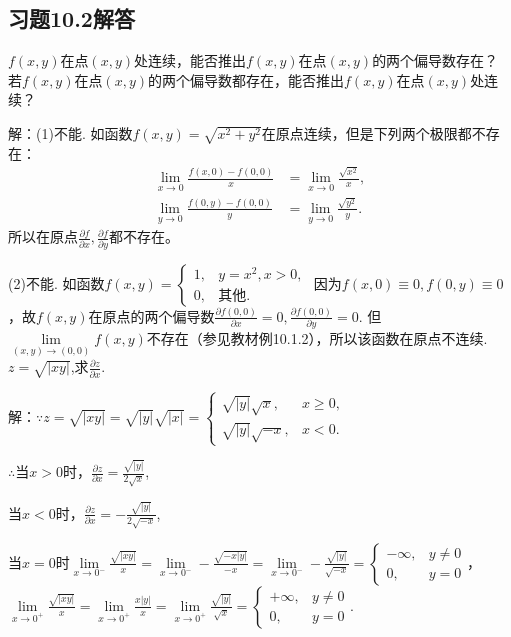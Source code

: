 \documentclass[12pt,UTF8]{ctexart}
\begin{document}
\subsection{习题10.2解答}
\begin{enumerate}
$f(x,y)$在点$(x,y)$处连续，能否推出$f(x,y)$在点$(x,y)$的两个偏导数存在？若$f(x,y)$在点$(x,y)$的两个偏导数都存在，能否推出$f(x,y)$在点$(x,y)$处连续？

解：(1)不能. 如函数$f(x,y)=\sqrt{x^2+y^2}$在原点连续，但是下列两个极限都不存在：
\[\begin{split}
\lim\limits_{x\rightarrow0}\frac{f(x,0)-f(0,0)}{x}&=\lim\limits_{x\rightarrow0}\frac{\sqrt{x^2}}{x},\\
\lim\limits_{y\rightarrow0}\frac{f(0,y)-f(0,0)}{y}&=\lim\limits_{y\rightarrow0}\frac{\sqrt{y^2}}{y}.
\end{split}\]
所以在原点$\frac{\partial f}{\partial x},\frac{\partial f}{\partial y}$都不存在。

(2)不能. 如函数$f(x,y)=\begin{cases}
1,&y=x^2,x>0,\\
0,&\text{其他}.
\end{cases}$ 因为$f(x,0)\equiv0,f(0,y)\equiv0$，故$f(x,y)$在原点的两个偏导数$\frac{\partial f(0,0)}{\partial x}=0,\frac{\partial f(0,0)}{\partial y}=0$. 但$\lim\limits_{(x,y)\rightarrow(0,0)}f(x,y)$不存在（参见教材例10.1.2），所以该函数在原点不连续.
$z=\sqrt{|xy|}$,求$\frac{\partial z}{\partial x}$.

解：$\because z=\sqrt{|xy|}=\sqrt{|y|}\sqrt{|x|}=\begin{cases}
\sqrt{|y|}\sqrt{x},&x\geq0,\\
\sqrt{|y|}\sqrt{-x},&x<0.
\end{cases}$

$\therefore$当$x>0$时，$\frac{\partial z}{\partial x}=\frac{\sqrt{|y|}}{2\sqrt x}$,

当$x<0$时，$\frac{\partial z}{\partial x}=-\frac{\sqrt{|y|}}{2\sqrt{-x}}$,

当$x=0$时$\lim\limits_{x\rightarrow0^-}\frac{\sqrt{|xy|}}{x}=\lim\limits_{x\rightarrow0^-}-\frac{\sqrt{-x|y|}}{-x}=\lim\limits_{x\rightarrow0^-}-\frac{\sqrt{|y|}}{\sqrt{-x}}=\begin{cases}
-\infty,&y\neq0\\
0,&y=0
\end{cases}$，\\
$\lim\limits_{x\rightarrow0^+}\frac{\sqrt{|xy|}}{x}=\lim\limits_{x\rightarrow0^+}\frac{x|y|}{x}=\lim\limits_{x\rightarrow0^+}\frac{\sqrt{|y|}}{\sqrt{x}}=\begin{cases}
+\infty,&y\neq0\\
0,&y=0
\end{cases}$.


\end{enumerate}
\end{document}
